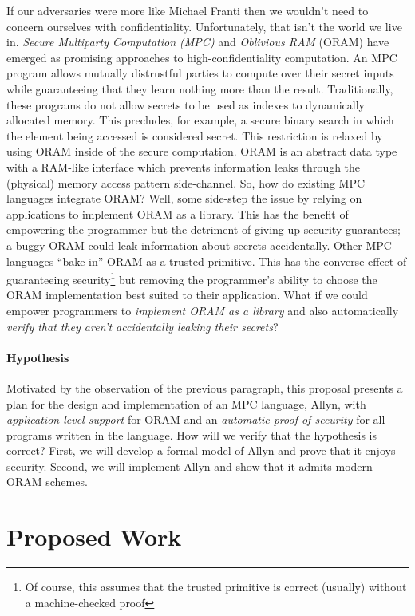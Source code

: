 \documentclass{report}
\newcommand{\lang}{Allyn\xspace}
\begin{document}
If our adversaries were more like Michael Franti then we wouldn’t need to concern ourselves with confidentiality.
Unfortunately, that isn’t the world we live in. \emph{Secure Multiparty Computation (MPC)} and \emph{Oblivious RAM} (ORAM)
have emerged as promising approaches to high-confidentiality computation. An MPC program allows mutually distrustful
parties to compute over their secret inputs while guaranteeing that they learn nothing more than the result.
Traditionally, these programs do not allow secrets to be used as indexes to dynamically allocated memory.
This precludes, for example, a secure binary search in which the element being accessed is considered secret.
This restriction is relaxed by using ORAM inside of the secure computation. ORAM is an abstract data type with a
RAM-like interface which prevents information leaks through the (physical) memory access pattern side-channel.
So, how do existing MPC languages integrate ORAM? Well, some side-step the issue by relying on applications
to implement ORAM as a library. This has the benefit of empowering the programmer but the detriment of
giving up security guarantees; a buggy ORAM could leak information about secrets accidentally.
Other MPC languages ``bake in'' ORAM as a trusted primitive. This has the converse effect of guaranteeing
security\footnote{Of course, this assumes that the trusted primitive is correct (usually) without a machine-checked proof}
but removing the programmer’s ability to choose the ORAM implementation best suited to their application.
What if we could empower programmers to \emph{implement ORAM as a library} and also automatically
\emph{verify that they aren’t accidentally leaking their secrets}?

\paragraph{Hypothesis} Motivated by the observation of the previous paragraph, this proposal presents a plan
for the design and implementation of an MPC language, \lang, with \emph{application-level support} for ORAM and an
\emph{automatic proof of security} for all programs written in the language. How will we verify that the hypothesis is correct?
First, we will develop a formal model of \lang and prove that it enjoys security.
Second, we will implement \lang and show that it admits modern ORAM schemes.

\section{Proposed Work}
\end{document}
